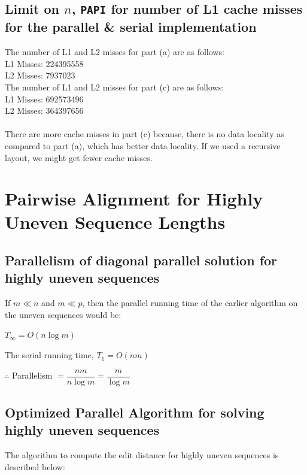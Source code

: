 \documentclass{article}
\begin{document}
\subsection{Limit on $n$, \texttt{PAPI} for number of L1 cache misses for the parallel \& serial implementation}
The number of L1 and L2 misses for part (a) are as follows:\\
L1 Misses: 224395558\\
L2 Misses: 7937023\\

The number of L1 and L2 misses for part (c) are as follows:\\
L1 Misses: 692573496\\
L2 Misses: 364397656\\
\\
There are more cache misses in part (c) because, there is no data locality
as compared to part (a), which has better data locality. If we used a
recursive layout, we might get fewer cache misses.

\clearpage

\section{Pairwise Alignment for Highly Uneven Sequence Lengths}

\subsection{Parallelism of diagonal parallel solution for highly uneven sequences}

If $m \ll n$ and $m \ll p$, then the parallel running time of the earlier algorithm on the uneven sequences would be:

$T_{\infty} = O(n\log{m})$

The serial running time, $T_1 = O(nm)$

$\therefore$ Parallelism $= \dfrac{nm}{n\log{m}} = \dfrac{m}{\log{m}}$

\subsection{Optimized Parallel Algorithm for solving highly uneven sequences}

The algorithm to compute the edit distance for highly uneven sequences is described below:
\end{document}
